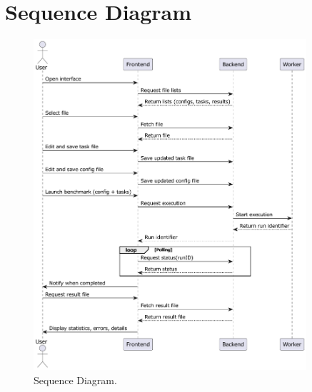 \chapter{Sequence Diagram}
\label{appendix:examples}


\begin{figure}[H]
    \includegraphics[width=0.9\textwidth]{./plantuml/sequence.pdf}
    \caption{Sequence Diagram.}
    \label{appendix:sequence}
\end{figure}